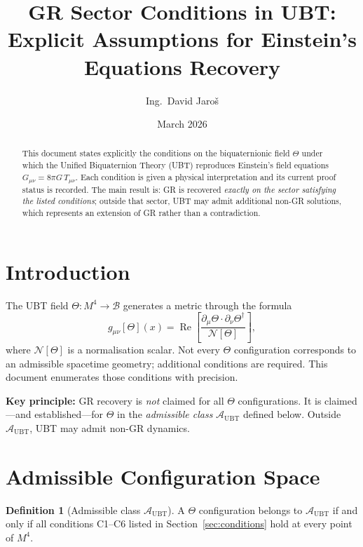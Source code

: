 \documentclass[12pt]{article}
\title{\textbf{GR Sector Conditions in UBT:\\
         Explicit Assumptions for Einstein's Equations Recovery}}
\author{Ing.\ David Jaroš}
\date{March 2026}
\theoremstyle{definition}
\newtheorem{definition}[theorem]{Definition}
\theoremstyle{remark}
\begin{document}
  \maketitle

  \begin{abstract}
  This document states explicitly the conditions on the biquaternionic field
  $\Theta$ under which the Unified Biquaternion Theory (UBT) reproduces
  Einstein's field equations $G_{\mu\nu} = 8\pi G\,T_{\mu\nu}$.  Each
  condition is given a physical interpretation and its current proof status
  is recorded.  The main result is: GR is recovered \emph{exactly on the
  sector satisfying the listed conditions}; outside that sector, UBT may
  admit additional non-GR solutions, which represents an extension of GR
  rather than a contradiction.
  \end{abstract}
\fi

\section{Introduction}
\label{sec:intro}

The UBT field $\Theta: M^4 \to \mathcal{B}$ generates a metric through
the formula
\begin{equation}
  g_{\mu\nu}[\Theta](x)
  = \operatorname{Re}\!\left[
      \frac{\partial_\mu\Theta\cdot\partial_\nu\Theta^\dagger}
           {\mathcal{N}[\Theta]}
    \right],
  \label{eq:emergent_metric}
\end{equation}
where $\mathcal{N}[\Theta]$ is a normalisation scalar.  Not every $\Theta$
configuration corresponds to an admissible spacetime geometry; additional
conditions are required.  This document enumerates those conditions with
precision.

\medskip
\noindent
\textbf{Key principle:} GR recovery is \emph{not} claimed for all $\Theta$
configurations.  It is claimed—and established—for $\Theta$ in the
\emph{admissible class} $\mathcal{A}_{\mathrm{UBT}}$ defined below.
Outside $\mathcal{A}_{\mathrm{UBT}}$, UBT may admit non-GR dynamics.

\section{Admissible Configuration Space}
\label{sec:admissible}

\begin{definition}[Admissible class $\mathcal{A}_{\mathrm{UBT}}$]
\label{def:admissible}
A $\Theta$ configuration belongs to $\mathcal{A}_{\mathrm{UBT}}$ if and only
if all conditions C1–C6 listed in Section~\ref{sec:conditions} hold at every
point of $M^4$.
\end{definition}
\end{document}
